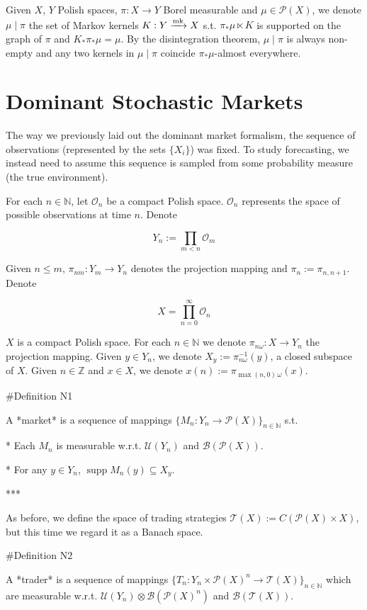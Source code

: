 \documentclass[a4paper]{article}
\DeclareMathOperator{\Supp}{supp}
\newcommand{\Nats}{\mathbb{N}}
\newcommand{\Ints}{\mathbb{Z}}
\newcommand{\Markov}{\xrightarrow{\textnormal{mk}}}
\newcommand{\Prob}{\mathcal{P}}
\newcommand{\Ob}{\mathcal{O}}
\newcommand{\T}{\mathcal{T}}
\newcommand{\B}{\mathcal{B}}
\newcommand{\UM}{\mathcal{U}}
\begin{document}
Given ${X}$, ${Y}$ Polish spaces, ${\pi: X \rightarrow Y}$ Borel measurable and ${\mu \in \Prob(X)}$, we denote ${\mu \mid \pi}$ the set of Markov kernels ${K: Y \Markov X}$ s.t. ${\pi_* \mu \ltimes K}$ is supported on the graph of ${\pi}$ and ${K_*\pi_* \mu = \mu}$. By the disintegration theorem, ${\mu \mid \pi}$ is always non-empty and any two kernels in ${\mu \mid \pi}$ coincide ${\pi_*\mu}$-almost everywhere.

\section{Dominant Stochastic Markets}

The way we previously laid out the dominant market formalism, the sequence of observations (represented by the sets $\{X_i\}$) was fixed. To study forecasting, we instead need to assume this sequence is sampled from some probability measure (the true environment).

For each ${n \in \Nats}$, let ${\Ob_n}$ be a compact Polish space. ${\Ob_n}$ represents the space of possible observations at time ${n}$. Denote 

$${Y_n:=\prod_{m < n} \Ob_m}$$

Given ${n \leq m}$, ${\pi_{nm}: Y_m \rightarrow Y_n}$ denotes the projection mapping and ${\pi_n:=\pi_{n,n+1}}$. Denote 

$${X = \prod_{n = 0}^\infty \Ob_n}$$

${X}$ is a compact Polish space. For each ${n \in \Nats}$ we denote ${\pi_{n\omega}: X \rightarrow Y_n}$ the projection mapping. Given ${y \in Y_n}$, we denote ${X_y:=\pi_{n\omega}^{-1}(y)}$, a closed subspace of ${X}$. Given $n \in \Ints$ and $x \in X$, we denote $x(n):=\pi_{\max(n,0)\,\omega}(x)$.

\#Definition N1

A *market* is a sequence of mappings ${\{M_n: Y_n \rightarrow \Prob(X)\}}_{n \in \Nats}$ s.t.

* Each ${M_n}$ is measurable w.r.t. ${\UM(Y_n)}$ and ${\B(\Prob(X))}$.

* For any ${y \in Y_n}$, ${\Supp M_n(y) \subseteq X_y}$.

***

As before, we define the space of trading strategies ${\T(X):=C(\Prob(X)\times X)}$, but this time we regard it as a Banach space. 

\#Definition N2

A *trader* is a sequence of mappings ${\{T_n: Y_n \times \Prob(X)^n \rightarrow \T(X)\}}_{n \in \Nats}$ which are measurable w.r.t. ${\UM(Y_n) \otimes \B(\Prob(X)^n)}$ and ${\B(\T(X))}$.
\end{document}
